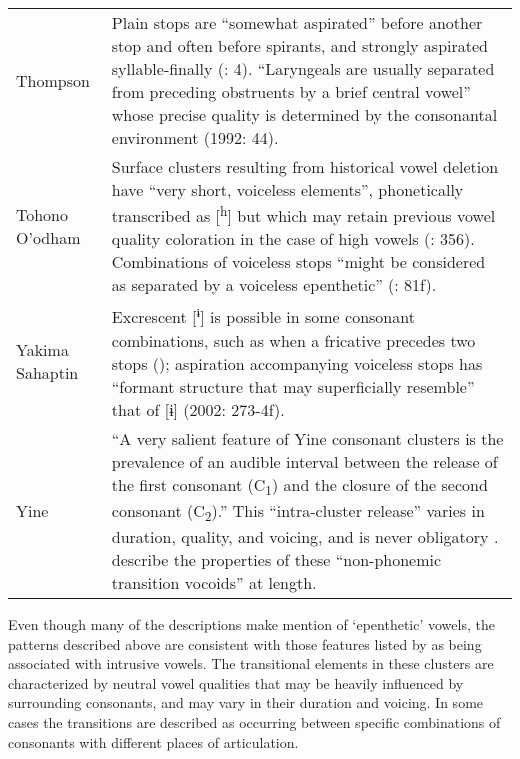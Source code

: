 \begin{longtable}{p{55pt}p{278.6pt}}
{Thompson} & Plain stops are “somewhat aspirated” before another stop and often before spirants, and strongly aspirated syllable-finally (\citealt{ThompsonThompson1992}: 4). “Laryngeals are usually separated from preceding obstruents by a brief central vowel” whose precise quality is determined by the consonantal environment (1992: 44).\\
{Tohono O’odham} & Surface clusters resulting from historical vowel deletion have “very short, voiceless elements”, phonetically transcribed as [\textsuperscript{h}] but which may retain previous vowel quality coloration in the case of high vowels (\citealt{HillZepeda1992}: 356). Combinations of voiceless stops “might be considered as separated by a voiceless epenthetic” (\citealt{Mason1950}: 81f).\\
{Yakima Sahaptin} & Excrescent [\textsuperscript{ɨ}] is possible in some consonant combinations, such as when a fricative precedes two stops (\citealt{HargusBeavert2002}); aspiration accompanying voiceless stops has “formant structure that may superficially resemble” that of [ɨ] (2002: 273-4f).\\
{Yine} & “A very salient feature of Yine consonant clusters is the prevalence of an audible interval between the release of the first consonant (C\textsubscript{1}) and the closure of the second consonant (C\textsubscript{2}).” This “intra-cluster release” varies in duration, quality, and voicing, and is never obligatory \citep[28-9]{Hanson2010}. \citet{MattesonPike1958} describe the properties of these “non-phonemic transition vocoids” at length.\\
\end{longtable}

  Even though many of the descriptions make mention of ‘epenthetic’ vowels, the patterns described above are consistent with those features listed by \citet{Hall2006} as being associated with intrusive vowels. The transitional elements in these clusters are characterized by neutral vowel qualities that may be heavily influenced by surrounding consonants, and may vary in their duration and voicing. In some cases the transitions are described as occurring between specific combinations of consonants with different places of articulation.

